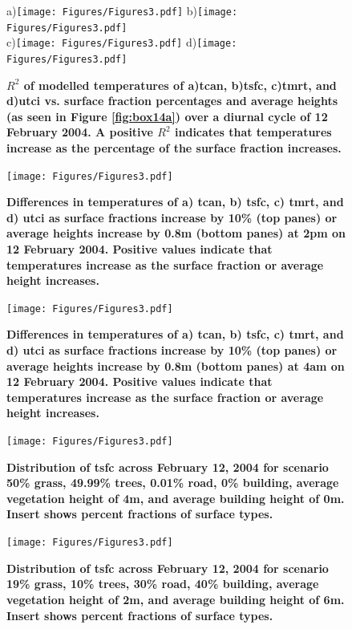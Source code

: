 \documentclass[final,3p,times,authoryear]{elsarticle}
\begin{document}
\begin{figure}
\centering
a)\texttt{[image: Figures/Figures3.pdf]}
b)\texttt{[image: Figures/Figures3.pdf]}\\
c)\texttt{[image: Figures/Figures3.pdf]}
d)\texttt{[image: Figures/Figures3.pdf]}
\caption{\bf $R^{2}$ of modelled temperatures of a)\gls{tcan}, b)\gls{tsfc}, c)\gls{tmrt}, and d)\gls{utci} vs. surface fraction percentages and average heights (as seen in Figure \ref{fig:box14a}) over a diurnal cycle of 12 February 2004. A positive $R^{2}$ indicates that temperatures increase as the percentage of the surface fraction increases. }
 \label{fig:r2parameters}
\end{figure}



\begin{figure}
\centering
\texttt{[image: Figures/Figures3.pdf]}
\caption{\bf Differences in temperatures of a) \gls{tcan}, b) \gls{tsfc}, c) \gls{tmrt}, and d) \gls{utci} as surface fractions increase by 10\% (top panes) or average heights increase by 0.8m (bottom panes) at 2pm on 12 February 2004. Positive values indicate that temperatures increase as the surface fraction or average height increases.}
 \label{fig:diff2pm}
\end{figure}

\begin{figure}
\centering
\texttt{[image: Figures/Figures3.pdf]}
\caption{\bf Differences in temperatures of a) \gls{tcan}, b) \gls{tsfc}, c) \gls{tmrt}, and d) \gls{utci} as surface fractions increase by 10\% (top panes) or average heights increase by 0.8m (bottom panes) at 4am on 12 February 2004. Positive values indicate that temperatures increase as the surface fraction or average height increases.}
 \label{fig:diff4am}
\end{figure}




\begin{figure}
\centering
\texttt{[image: Figures/Figures3.pdf]}
\caption{\bf Distribution of \gls{tsfc} across February 12, 2004 for scenario 50\% grass, 49.99\% trees, 0.01\% road, 0\% building, average vegetation height of 4m, and average building height of 0m. Insert shows percent fractions of surface types.}
 \label{fig:dist1}
\end{figure}


\begin{figure}
\centering
\texttt{[image: Figures/Figures3.pdf]}
\caption{\bf Distribution of \gls{tsfc} across February 12, 2004 for scenario 19\% grass, 10\% trees, 30\% road, 40\% building, average vegetation height of 2m, and average building height of 6m. Insert shows percent fractions of surface types.}
 \label{fig:dist2}
\end{figure}
\end{document}
